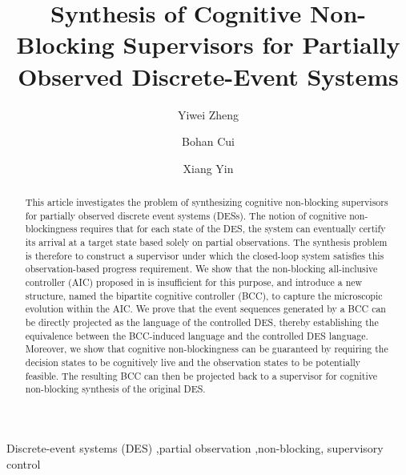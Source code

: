 \documentclass[final,5p,times,twocolumn,authoryear]{elsarticle}
\begin{document}
\begin{frontmatter}

\title{Synthesis of Cognitive Non-Blocking Supervisors for Partially Observed Discrete-Event Systems}

\author[inst1]{Yiwei Zheng}
\author[inst1]{Bohan Cui}
\author[inst1]{Xiang Yin}

\address[inst1]{TODO Department of Example Engineering, Example University, City, Country}

\begin{abstract}
This article investigates the problem of synthesizing cognitive non-blocking supervisors for partially observed discrete event systems (DESs).
The notion of cognitive non-blockingness requires that for each state of the DES, the system can eventually certify its arrival at a target state based solely on partial observations.
The synthesis problem is therefore to construct a supervisor under which the closed-loop system satisfies this observation-based progress requirement.
%
We show that the non-blocking all-inclusive controller (AIC) proposed in \cite{yin2016synthesis} is insufficient for this purpose, and introduce a new structure, named the bipartite cognitive controller (BCC), to capture the microscopic evolution within the AIC.
We prove that the event sequences generated by a BCC can be directly projected as the language of the controlled DES, thereby establishing the equivalence between the BCC-induced language and the controlled DES language.
Moreover, we show that cognitive non-blockingness can be guaranteed by requiring the decision states to be cognitively live and the observation states to be potentially feasible.
The resulting BCC can then be projected back to a supervisor for cognitive non-blocking synthesis of the original DES.
\end{abstract}

\begin{keyword}
Discrete-event systems (DES) \sep partial observation \sep non-blocking, supervisory control
\end{keyword}

\end{frontmatter}
\end{document}
